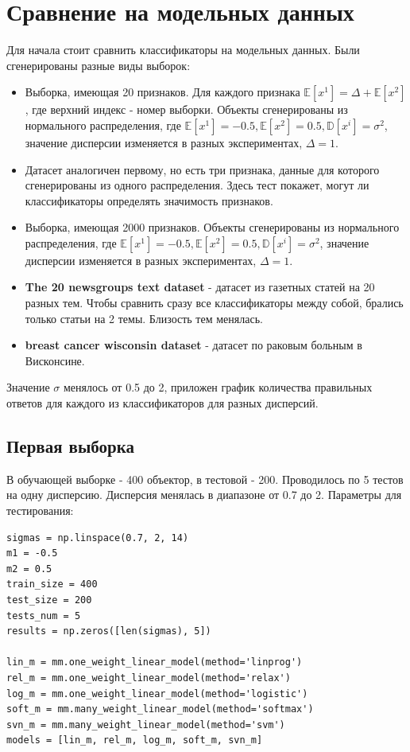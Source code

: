 \documentclass[a4paper]{article}
\newcommand{\E}{\mathbb{E}}
\begin{document}
\section{Сравнение на модельных данных}

Для начала стоит сравнить классификаторы на модельных данных. Были сгенерированы разные виды выборок:
\begin{itemize}
\item Выборка, имеющая 20 признаков. Для каждого признака $\E[x^1] = \Delta + \E[x^2]$, где верхний индекс - номер выборки. Объекты сгенерированы из нормального распределения, где $\E[x^1] = -0.5, \E[x^2] = 0.5, \mathbb{D}[x^i] = \sigma^2$, значение дисперсии изменяется в разных экспериментах, $\Delta = 1$.
\item Датасет аналогичен первому, но есть три признака, данные для которого сгенерированы из одного распределения. Здесь тест покажет, могут ли классификаторы определять значимость признаков.
\item Выборка, имеющая 2000 признаков.  Объекты сгенерированы из нормального распределения, где $\E[x^1] = -0.5, \E[x^2] = 0.5, \mathbb{D}[x^i] = \sigma^2$, значение дисперсии изменяется в разных экспериментах, $\Delta = 1$.
\item \textbf{The 20 newsgroups text dataset} - датасет из газетных статей на 20 разных тем. Чтобы сравнить сразу все классификаторы между собой, брались только статьи на 2 темы. Близость тем менялась.
\item \textbf{breast cancer wisconsin dataset} - датасет по раковым больным в Висконсине.
\end{itemize}
Значение $\sigma$ менялось от 0.5 до 2, приложен график количества правильных ответов для каждого из классификаторов для разных дисперсий.

\subsection{Первая выборка}
В обучающей выборке - 400 объектор, в тестовой - 200. Проводилось по 5 тестов на одну дисперсию. Дисперсия менялась в диапазоне от 0.7 до 2. Параметры для тестирования:
\begin{lstlisting}
sigmas = np.linspace(0.7, 2, 14)
m1 = -0.5
m2 = 0.5
train_size = 400
test_size = 200
tests_num = 5
results = np.zeros([len(sigmas), 5])

lin_m = mm.one_weight_linear_model(method='linprog')
rel_m = mm.one_weight_linear_model(method='relax')
log_m = mm.one_weight_linear_model(method='logistic')
soft_m = mm.many_weight_linear_model(method='softmax')
svn_m = mm.many_weight_linear_model(method='svm')
models = [lin_m, rel_m, log_m, soft_m, svn_m]
\end{lstlisting}
\end{document}
